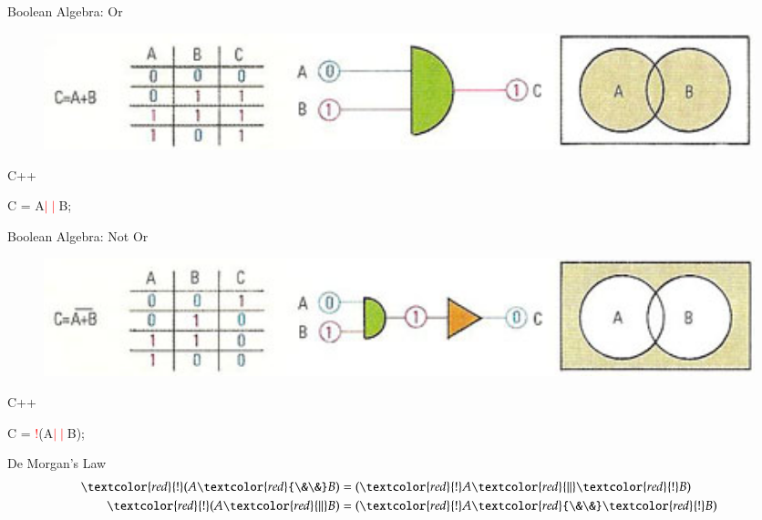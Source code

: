 \documentclass[xcolor={dvipsnames}]{beamer}
\begin{document}
\begin{frame}{Boolean Algebra: Or}
\begin{figure}
		\href{http://www.daviddarling.info/encyclopedia/B/Boolean_algebra.html}{\includegraphics[width=1\textwidth]{or}}
\end{figure}
\pause
	\begin{block}{C++}
		\begin{center}
			{\LARGE C = A\textcolor{red}{$\mid\mid$}B;}
		\end{center}
	\end{block}
\end{frame}

\begin{frame}{Boolean Algebra: Not Or}
\begin{figure}
		\href{http://www.daviddarling.info/encyclopedia/B/Boolean_algebra.html}{\includegraphics[width=1\textwidth]{not_or}}
	\end{figure}
	\pause
	\begin{block}{C++}
		\begin{center}
			{\LARGE C = \textcolor{red}{!}(A\textcolor{red}{$\mid\mid$}B);}
		\end{center}
	\end{block}
\end{frame}

\begin{frame}{De Morgan's Law}
	\begin{align*}
	\textcolor{red}{!}(A\textcolor{red}{\&\&}B)  &= (\textcolor{red}{!}A \textcolor{red}{\mid\mid}\textcolor{red}{!}B)\\
	\textcolor{red}{!}(A\textcolor{red}{\mid\mid}B)  &= (\textcolor{red}{!}A \textcolor{red}{\&\&}\textcolor{red}{!}B)
	\end{align*}
\end{frame}
\end{document}
